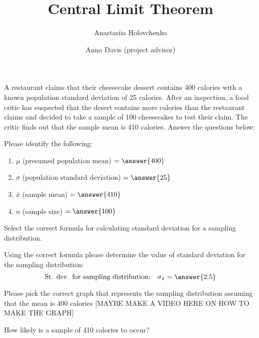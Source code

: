 \documentclass{ximera}
\author{Anastasiia Holovchenko \and Anna Davis (project advisor)} \title{Central Limit Theorem}
\begin{document}
\begin{abstract}
\end{abstract}
\maketitle

\begin{example}\label{ex:cheesecake}
A restaurant claims that their cheesecake dessert contains 400 calories with a known population standard deviation of 25 calories. After an inspection, a food critic has suspected that the desert contains more calories than the restaurant claims and decided to take a sample of 100 cheesecakes to test their claim. The critic finds out that the sample mean is 410 calories. Answer the questions below:

\begin{question} 
Please identify the following:
\begin{enumerate}
    \item $\mu$ (presumed population mean) $= \answer{400}$
    \item $\sigma$ (population standard deviation) $= \answer{25}$
    \item $\bar{x}$ (sample mean) $=\answer{410}$
    \item $n$ (sample size) $= \answer{100}$
\end{enumerate}
\end{question}

\begin{question} Select the correct formula for calculating standard deviation for a sampling distribution.

\begin{multipleChoice}  
\end{multipleChoice} 

\end{question}

\begin{question} Using the correct formula please determine the value of standard deviation for the sampling distribution:
$$\mbox{St. dev. for sampling distribution:}\quad\sigma_{\bar{x}}= \answer{2.5}$$
\end{question}

\begin{question} Please pick the correct graph that represents the sampling distribution assuming that the mean is 400 calories [MAYBE MAKE A VIDEO HERE ON HOW TO MAKE THE GRAPH]
\end{question}

\begin{question}
How likely is a sample of 410 calories to occur?
\begin{multipleChoice}
\end{multipleChoice}
\end{question}

\end{example}
\end{document}
